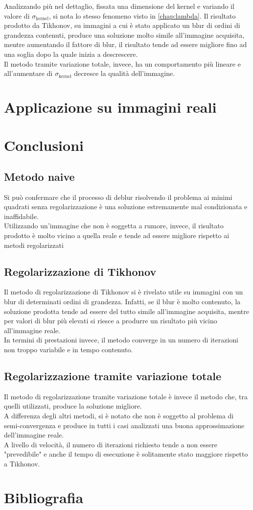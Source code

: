 \documentclass[11pt]{article}
\begin{document}
Analizzando più nel dettaglio, fissata una dimensione del kernel e variando il valore di $\sigma_{\text{kernel}}$, si nota lo stesso fenomeno visto in \autoref{chap:lambda}. 
Il risultato prodotto da Tikhonov, su immagini a cui è stato applicato un blur di ordini di grandezza contenuti, produce una soluzione molto simile all'immagine acquisita, 
mentre aumentando il fattore di blur, il risultato tende ad essere migliore fino ad una soglia dopo la quale inizia a descrescere.\\
Il metodo tramite variazione totale, invece, ha un comportamento più lineare e all'aumentare di $\sigma_{\text{kernel}}$ decresce la qualità dell'immagine.

\section{Applicazione su immagini reali}


\section{Conclusioni}
\subsection{Metodo naive}
Si può confermare che il processo di deblur risolvendo il problema ai minimi quadrati senza regolarizzazione è una soluzione estremamente mal condizionata e inaffidabile.\\
Utilizzando un'immagine che non è soggetta a rumore, invece, il risultato prodotto è molto vicino a quella reale e tende ad essere migliore rispetto ai metodi regolarizzati

\subsection{Regolarizzazione di Tikhonov}
Il metodo di regolarizzazione di Tikhonov si è rivelato utile su immagini con un blur di determinati ordini di grandezza. 
Infatti, se il blur è molto contenuto, la soluzione prodotta tende ad essere del tutto simile all'immagine acquisita, mentre per valori di blur più elevati si riesce a produrre un risultato più vicino all'immagine reale.\\
In termini di prestazioni invece, il metodo converge in un numero di iterazioni non troppo variabile e in tempo contenuto.

\subsection{Regolarizzazione tramite variazione totale}
Il metodo di regolarizzazione tramite variazione totale è invece il metodo che, tra quelli utilizzati, produce la soluzione migliore.\\
A differenza degli altri metodi, si è notato che non è soggetto al problema di semi-convergenza e produce in tutti i casi analizzati una buona approssimazione dell'immagine reale.\\
A livello di velocità, il numero di iterazioni richiesto tende a non essere "prevedibile" e anche il tempo di esecuzione è solitamente stato maggiore rispetto a Tikhonov.

\section{Bibliografia}
\end{document}
